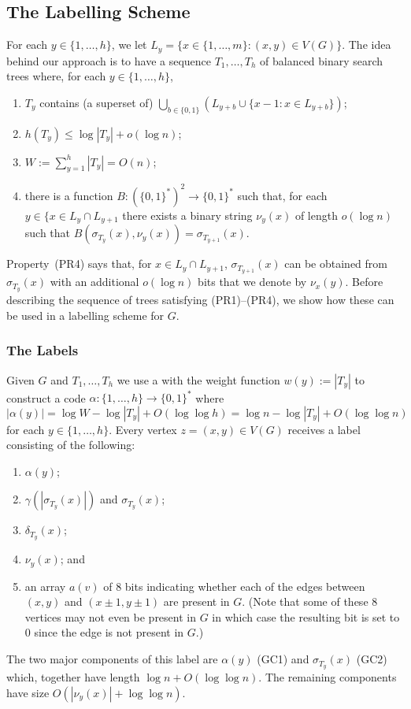 \documentclass[kpfonts]{patmorin}
\begin{document}
\subsection{The Labelling Scheme}

For each $y\in\{1,\ldots,h\}$, we let $L_y=\{x\in\{1,\ldots,m\}:(x,y)\in V(G)\}$.  The idea behind our approach is to have a sequence $T_1,\ldots,T_h$ of balanced binary search trees where, for each $y\in\{1,\ldots,h\}$,
\begin{enumerate}[(PR1)]
  \item $T_y$ contains (a superset of) $\bigcup_{b\in\{0,1\}} (L_{y+b}\cup \{x-1:x\in L_{y+b}\})$;
  
  \item $h(T_y)\le\log |T_y| + o(\log n)$;
  
  \item $W:=\sum_{y=1}^h |T_y| = O(n)$;
  
  \item there is a function $B:(\{0,1\}^*)^2\to\{0,1\}^*$ such that, for each $y\in\{x\in L_y\cap L_{y+1}$ there exists a binary string $\nu_y(x)$ of length $o(\log n)$ such that $B(\sigma_{T_{y}}(x), \nu_y(x))=\sigma_{T_{y+1}}(x)$.
\end{enumerate}

Property~(PR4) says that, for $x\in L_y\cap L_{y+1}$, $\sigma_{T_{y+1}}(x)$ can be obtained from $\sigma_{T_{y}}(x)$ with an additional $o(\log n)$ bits that we denote by $\nu_x(y)$.  Before describing the sequence of trees satisfying (PR1)--(PR4), we show how these can be used in a labelling scheme for $G$. 


\subsubsection{The Labels}

Given $G$ and $T_{1},\ldots,T_h$ we use a  with the weight function $w(y):=|T_y|$ to construct a code $\alpha:\{1,\ldots,h\}\to\{0,1\}^*$ where
\[  
  |\alpha(y)| = \log W-\log|T_y| + O(\log\log h) = \log n - \log|T_y| + O(\log\log n)
\]
for each $y\in\{1,\ldots,h\}$.  Every vertex $z=(x,y)\in V(G)$ receives a label consisting of the following:  
\begin{enumerate}[(GC1)]
  \item $\alpha(y)$;
  \item $\gamma(|\sigma_{T_y}(x)|)$ and $\sigma_{T_y}(x)$;    
  \item $\delta_{T_y}(x)$;
  \item $\nu_y(x)$; and
  \item an array $a(v)$ of $8$ bits indicating whether each of the edges between $(x,y)$ and $(x\pm 1,y\pm 1)$ are present in $G$.  (Note that some of these 8 vertices may not even be present in $G$ in which case the resulting bit is set to 0 since the edge is not present in $G$.)
\end{enumerate}
The two major components of this label are $\alpha(y)$ (GC1) and $\sigma_{T_y}(x)$ (GC2) which, together have length $\log n + O(\log\log n)$.  The remaining components have size $O(|\nu_y(x)|+\log\log n)$.  
\end{document}
